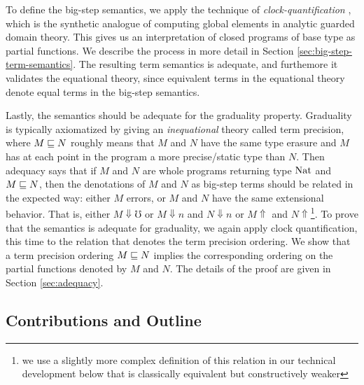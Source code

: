 To define the big-step semantics, we apply the technique of
\emph{clock-quantification} \cite{atkey-mcbride2013}, which is the synthetic
analogue of computing global elements in analytic guarded domain theory. This
gives us an interpretation of closed programs of base type as partial functions.
We describe the process in more detail in Section
\ref{sec:big-step-term-semantics}. The resulting term semantics is adequate, and
furthemore it validates the equational theory, since equivalent terms in the
equational theory denote equal terms in the big-step semantics.

Lastly, the semantics should be adequate for the graduality property. Graduality
is typically axiomatized by giving an \emph{inequational} theory called term
precision, where $M \sqsubseteq N$ roughly means that $M$ and $N$ have the same type
erasure and $M$ has at each point in the program a more precise/static type than
$N$. Then adequacy says that if $M$ and $N$ are whole programs returning type
$\text{Nat}$ and $M \sqsubseteq N$, then the denotations of $M$ and $N$ as big-step terms
should be related in the expected way: either $M$ errors, or $M$ and $N$ have
the same extensional behavior. That is, either $M\Downarrow \mho$ or $M
\Downarrow n $ and $N \Downarrow n$ or $M \Uparrow $ and $N
\Uparrow$\footnote{we use a slightly more complex definition of this relation in
our technical development below that is classically equivalent but
constructively weaker}.
%
To prove that the semantics is adequate for graduality, we again apply clock
quantification, this time to the relation that denotes the term precision
ordering. We show that a term precision ordering $M \sqsubseteq N$ implies the
corresponding ordering on the partial functions denoted by $M$ and $N$. The
details of the proof are given in Section \ref{sec:adequacy}.





\subsection{Contributions and Outline}

